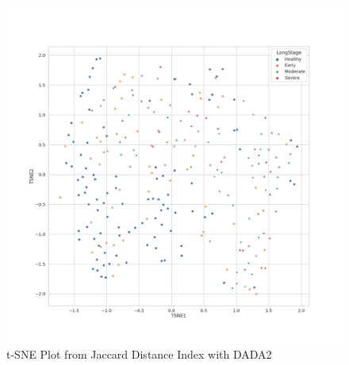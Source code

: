 \documentclass[a4paper]{article}
\begin{document}
            \begin{figure}[p]
                \centering
                \includegraphics[width=0.6 \linewidth]{figures/BetaDiversity/DADA2.jaccard.png}
                \caption{t-SNE Plot from Jaccard Distance Index with DADA2}
                \label{fig:tsne-jaccard-dada2}
            \end{figure}
\end{document}

